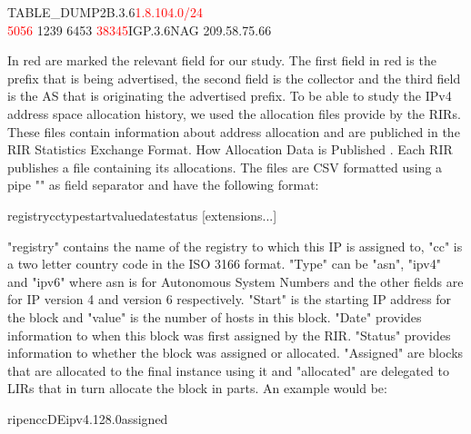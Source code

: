 \documentclass[11pt,a4paper]{scrreprt}
\begin{document}
\hspace{1cm} TABLE\_DUMP2\textbar B.3.6\textbar \textcolor{red}{1.8.104.0/24}\textbar \\ \textcolor{red}{5056} 1239 6453 \textcolor{red}{38345}\textbar  IGP.3.6\textbar \textbar NAG 209.58.75.66\textbar

\vspace{5mm}

In red are marked the relevant field for our study. The first field in red is the prefix that is being advertised, the second field is the collector and the third field is the AS that is originating the advertised prefix.
To be able to study the IPv4 address space allocation history, we used the allocation files \cite{Potaroo} provide by the RIRs. These files contain information about address allocation and are publiched in the RIR Statistics Exchange Format.
How Allocation Data is Published \cite{ALLOC_FILES}. Each RIR publishes a file containing its allocations. The files are CSV formatted using a pipe "\textbar" as field separator and have the following format:
\vspace{5mm}

\hspace{1cm}	 registry\textbar cc\textbar type\textbar start\textbar value\textbar date\textbar status [\textbar extensions...]
	
\vspace{5mm}

"registry" contains the name of the registry to which this IP is assigned to, "cc" is a two letter country code in the ISO 3166 format. "Type" can be "asn", "ipv4" and "ipv6" where asn is for Autonomous System Numbers and the other fields are for IP version 4 and version 6 respectively. "Start" is the starting IP address for the block and "value" is the number of hosts in this block. "Date" provides information to when this block was first assigned by the RIR. "Status" provides information to whether the block was assigned or allocated. "Assigned" are blocks that are allocated to the final instance using it and "allocated" are delegated to LIRs that in turn allocate the block in parts. An example would be:
\vspace{5mm}

\hspace{1cm}	 ripencc\textbar DE\textbar ipv4.128.0\textbar assigned

\vspace{5mm}
\end{document}
